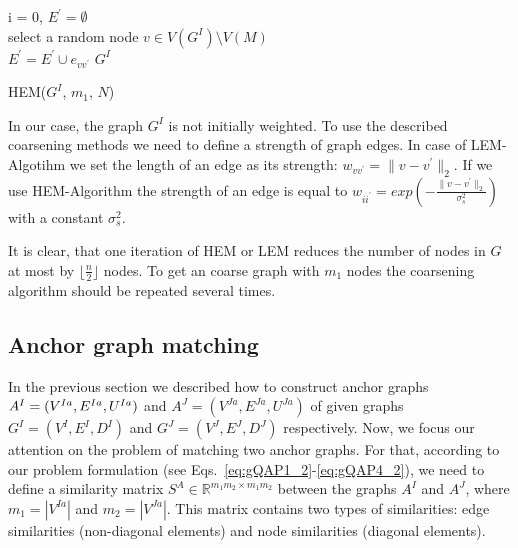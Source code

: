 \begin{algorithm}[h]
	i = 0, $E^\prime=\emptyset$ \\
	{ select a random node $v\in V(G^I)\setminus V(M)$ \\
	  {$E^\prime=E^\prime\cup{e_{vv^\prime}}$}
	}
	\Return $G^I$
	\caption{HEM($G^I$, $m_1$, $N$)} \label{alg:HEM}
\end{algorithm}

In our case, the graph $G^I$ is not initially weighted. To use the described coarsening methods we need to define a strength of graph edges. In case of LEM-Algotihm we set the length of an edge as its strength: $w_{vv^\prime}=\|v-v^\prime\|_{2}$. If we use HEM-Algorithm the strength of an edge is equal to $w_{ii^\prime} = exp(-\frac{\|v-v^\prime\|_{2}}{\sigma^2_{s}})$ with a constant $\sigma^2_{s}$.

It is clear, that one iteration of HEM or LEM reduces the number of nodes in $G$ at most by $\lfloor\frac{n}{2} \rfloor$ nodes. To get an coarse graph with $m_1$ nodes the coarsening algorithm should be repeated several times.

\subsection{Anchor graph matching}
In the previous section we described how to construct anchor graphs $A^I=(V^{Ia},E^{Ia},\newline U^{Ia})$ and $A^J=(V^{Ja},E^{Ja},U^{Ja})$ of given graphs $G^I = (V^I, E^I, D^I)$ and $G^J=(V^J, E^J, D^J)$ respectively. Now, we focus our attention on the problem of matching two anchor graphs. For that, according to our problem formulation (see Eqs.~\eqref{eq:gQAP1_2}-\eqref{eq:gQAP4_2}), we need to define a similarity matrix $S^A\in\mathbb{R}^{m_1m_2\times m_1m_2}$ between the graphs $A^I$ and $A^J$, where $m_1=|V^{Ia}|$ and $m_2=|V^{Ja}|$. This matrix contains two types of similarities: edge similarities (non-diagonal elements) and node similarities (diagonal elements).

